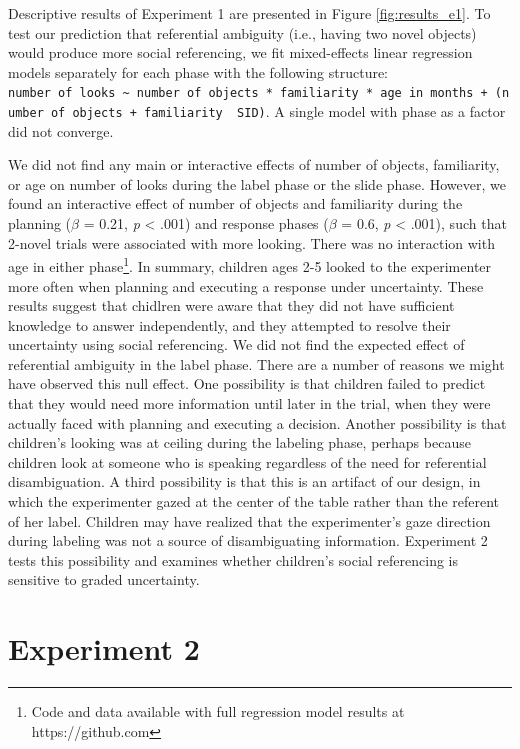 \documentclass[10pt, letterpaper]{article}
\begin{document}
Descriptive results of Experiment 1 are presented in Figure
\ref{fig:results_e1}. To test our prediction that referential ambiguity
(i.e., having two novel objects) would produce more social referencing,
we fit mixed-effects linear regression models separately for each phase
with the following structure:
\texttt{number\ of\ looks\ \textasciitilde{}\ number\ of\ objects\ *\ familiarity\ *\ age\ in\ months\ +\ (number\ of\ objects\ +\ familiarity\ \textbar{}\ SID)}.
A single model with phase as a factor did not converge.

We did not find any main or interactive effects of number of objects,
familiarity, or age on number of looks during the label phase or the
slide phase. However, we found an interactive effect of number of
objects and familiarity during the planning (\(\beta\) = 0.21, \emph{p}
\textless{} .001) and response phases (\(\beta\) = 0.6, \emph{p}
\textless{} .001), such that 2-novel trials were associated with more
looking. There was no interaction with age in either
phase\footnote{Code and data available with full regression model results at https://github.com}.
In summary, children ages 2-5 looked to the experimenter more often when
planning and executing a response under uncertainty. These results
suggest that chidlren were aware that they did not have sufficient
knowledge to answer independently, and they attempted to resolve their
uncertainty using social referencing. We did not find the expected
effect of referential ambiguity in the label phase. There are a number
of reasons we might have observed this null effect. One possibility is
that children failed to predict that they would need more information
until later in the trial, when they were actually faced with planning
and executing a decision. Another possibility is that children's looking
was at ceiling during the labeling phase, perhaps because children look
at someone who is speaking regardless of the need for referential
disambiguation. A third possibility is that this is an artifact of our
design, in which the experimenter gazed at the center of the table
rather than the referent of her label. Children may have realized that
the experimenter's gaze direction during labeling was not a source of
disambiguating information. Experiment 2 tests this possibility and
examines whether children's social referencing is sensitive to graded
uncertainty.

\section{Experiment 2}\label{experiment-2}
\end{document}
